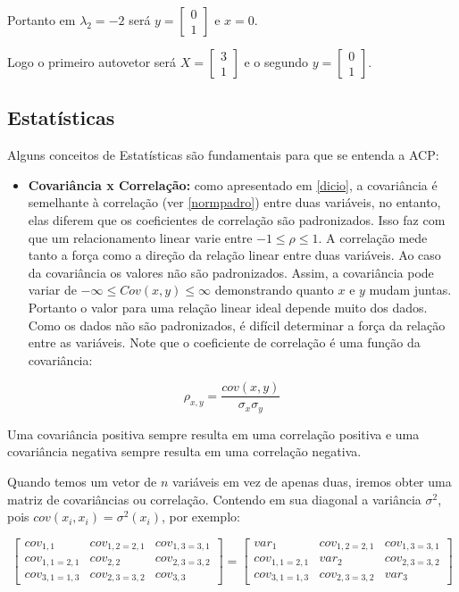 \documentclass[
]{book}
\providecommand{\tightlist}{%
  \setlength{\itemsep}{0pt}\setlength{\parskip}{0pt}}
\begin{document}
Portanto em \(\lambda_2=-2\) será \(y=\begin{bmatrix}0\\1\end{bmatrix}\) e \(x=0\).

Logo o primeiro autovetor será \(X=\begin{bmatrix}3\\1\end{bmatrix}\) e o segundo \(y=\begin{bmatrix}0\\1\end{bmatrix}\).

\hypertarget{estatuxedsticas}{%
\subsection{Estatísticas}\label{estatuxedsticas}}

Alguns conceitos de Estatísticas são fundamentais para que se entenda a ACP:

\begin{itemize}
\tightlist
\item
  \textbf{Covariância x Correlação:} como apresentado em \ref{dicio}, a covariância é semelhante à correlação (ver \ref{normpadro}) entre duas variáveis, no entanto, elas diferem que os coeficientes de correlação são padronizados. Isso faz com que um relacionamento linear varie entre \(-1 \leq \rho \leq 1\). A correlação mede tanto a força como a direção da relação linear entre duas variáveis. Ao caso da covariância os valores não são padronizados. Assim, a covariância pode variar de \(-\infty \leq Cov (x,y) \leq \infty\) demonstrando quanto \(x\) e \(y\) mudam juntas. Portanto o valor para uma relação linear ideal depende muito dos dados. Como os dados não são padronizados, é difícil determinar a força da relação entre as variáveis. Note que o coeficiente de correlação é uma função da covariância:
\end{itemize}

\[\rho_{x,y}=\frac{cov(x,y)}{\sigma_x \sigma_y}\]

Uma covariância positiva sempre resulta em uma correlação positiva e uma covariância negativa sempre resulta em uma correlação negativa.

Quando temos um vetor de \(n\) variáveis em vez de apenas duas, iremos obter uma matriz de covariâncias ou correlação. Contendo em sua diagonal a variância \(\sigma^2\), pois \(cov(x_i,x_i)=\sigma^2(x_i)\), por exemplo:

\[\begin{bmatrix}
cov_{1,1} &cov_{1,2=2,1}  &cov_{1,3=3,1} \\ 
cov_{1,1=2,1} &cov_{2,2}  &cov_{2,3=3,2} \\ 
cov_{3,1=1,3} &cov_{2,3=3,2} & cov_{3,3}
\end{bmatrix} = \begin{bmatrix}
var_{1} &cov_{1,2=2,1}  &cov_{1,3=3,1} \\ 
cov_{1,1=2,1} &var_{2}  &cov_{2,3=3,2} \\ 
cov_{3,1=1,3} &cov_{2,3=3,2} & var_{3}
\end{bmatrix}\]
\end{document}
